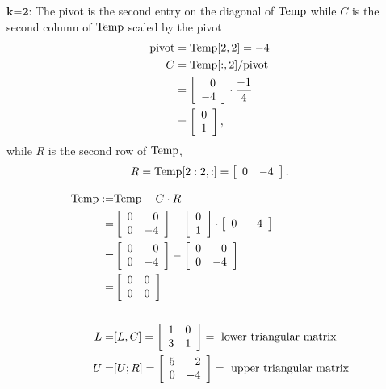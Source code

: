 $\textbf{k=2:}$ The pivot is the second entry on the diagonal of $\rm Temp$ while $C$ is the second column of ${\rm Temp}$ scaled by the pivot
\begin{align*}
\textrm{pivot} &= {\rm Temp}[2,2] = -4\\
C&= {\rm Temp[:,2]} \slash\textrm{pivot} \\
&= \left[\begin{array}{r} 0\\  -4 \end{array} \right] \cdot \frac{-1}{4}\\
&= \left[\begin{array}{r} 0\\  1 \end{array} \right], 
\end{align*}
while $R$ is the second row of ${\rm Temp}$,
$$ R = {\rm Temp[2:2,:]} =\left[\begin{array}{rr} 0 & -4 \end{array} \right].$$

\begin{align*}
    {\rm Temp}:=& {\rm Temp}-C \cdot R \\
    =& \left[\begin{array}{rr} 0 & 0\\
0 & -4 \end{array}\right] -  \left[\begin{array}{r} 0 \\ 1 \end{array} \right] \cdot  \left[\begin{array}{rr} 0 & -4 \end{array} \right] \\
=&  \left[\begin{array}{rr} 0 & 0\\
0 & -4 \end{array}\right] -   \left[\begin{array}{rr} 0 & 0\\
0 & -4 \end{array}\right] \\
=&   \left[\begin{array}{rr} 0 & 0\\
0 & 0\end{array}\right] \\
\\
L=&[L,C] = \left[\begin{array}{rr} 1 & 0\\ 3 & 1\end{array} \right] = ~\textrm{lower triangular matrix}\\
U=&[U;R] = \left[\begin{array}{rr} 5 & 2 \\ 0 & -4\end{array} \right] = ~\textrm{upper triangular matrix}
\end{align*}


